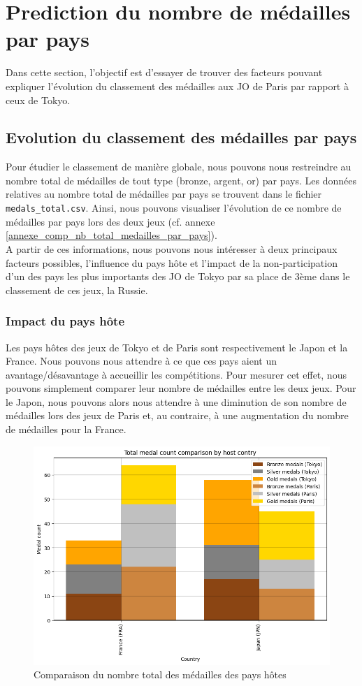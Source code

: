 \documentclass{article}
\begin{document}
\section{Prediction du nombre de médailles par pays}
Dans cette section, l'objectif est d'essayer de trouver des facteurs pouvant expliquer l'évolution du classement des médailles aux JO de Paris par rapport à ceux de Tokyo.

\subsection{Evolution du classement des médailles par pays}
Pour étudier le classement de manière globale, nous pouvons nous restreindre au nombre total de médailles de tout type (bronze, argent, or) par pays. Les données relatives au nombre total de médailles par pays se trouvent dans le fichier \verb|medals_total.csv|. Ainsi, nous pouvons visualiser l'évolution de ce nombre de médailles par pays lors des deux jeux (cf. annexe \ref{annexe_comp_nb_total_medailles_par_pays}).
\\

A partir de ces informations, nous pouvons nous intéresser à deux principaux facteurs possibles, l'influence du pays hôte et l'impact de la non-participation d'un des pays les plus importants des JO de Tokyo par sa place de 3ème dans le classement de ces jeux, la Russie.

\subsubsection{Impact du pays hôte}

Les pays hôtes des jeux de Tokyo et de Paris sont respectivement le Japon et la France. Nous pouvons nous attendre à ce que ces pays aient un avantage/désavantage à accueillir les compétitions. Pour mesurer cet effet, nous pouvons simplement comparer leur nombre de médailles entre les deux jeux. Pour le Japon, nous pouvons alors nous attendre à une diminution de son nombre de médailles lors des jeux de Paris et, au contraire, à une augmentation du nombre de médailles pour la France.

\begin{figure}[H]
    \centering
    \includegraphics[width=0.6\linewidth]{assets/comp_nb_total_medailles_pays_hotes.png}
    \caption{Comparaison du nombre total des médailles des pays hôtes}
    \label{fig:enter-label}
\end{figure}
\end{document}
